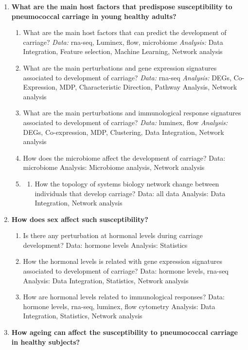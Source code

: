\documentclass[
]{book}
\providecommand{\tightlist}{%
  \setlength{\itemsep}{0pt}\setlength{\parskip}{0pt}}
\begin{document}
\begin{enumerate}
\def\labelenumi{\arabic{enumi}.}
\item
  \textbf{What are the main host factors that predispose susceptibility to pneumococcal carriage in young healthy adults?}

  \begin{enumerate}
  \def\labelenumii{\arabic{enumii}.}
  \item
    What are the main host factors that can predict the development of carriage? \emph{Data:} rna-seq, Luminex, flow, microbiome \emph{Analysis:} Data Integration, Feature selection, Machine Learning, Network analysis
  \item
    What are the main perturbations and gene expression signatures associated to development of carriage? \emph{Data:} rna-seq \emph{Analysis:} DEGs, Co-Expression, MDP, Characteristic Direction, Pathway Analysis, Network analysis
  \item
    What are the main perturbations and immunological response signatures associated to development of carriage? \emph{Data:} luminex, flow \emph{Analysis:} DEGs, Co-expression, MDP, Clustering, Data Integration, Network analysis
  \item
    How does the microbiome affect the development of carriage? Data: microbiome Analysis: Microbiome analysis, Network analysis
  \item
    \begin{enumerate}
    \def\labelenumiii{\arabic{enumiii}.}
    \tightlist
    \item
      How the topology of systems biology network change between individuals that develop carriage? Data: all data Analysis: Data Integration, Network analysis
    \end{enumerate}
  \end{enumerate}
\item
  \textbf{How does sex affect such susceptibility?}

  \begin{enumerate}
  \def\labelenumii{\arabic{enumii}.}
  \item
    Is there any perturbation at hormonal levels during carriage development? Data: hormone levels Analysis: Statistics
  \item
    How the hormonal levels is related with gene expression signatures associated to development of carriage? Data: hormone levels, rna-seq Analysis: Data Integration, Statistics, Network analysis
  \item
    How are hormonal levels related to immunological responses? Data: hormone levels, rna-seq, luminex, flow cytometry Analysis: Data Integration, Statistics, Network analysis
  \end{enumerate}
\item
  \textbf{How ageing can affect the susceptibility to pneumococcal carriage in healthy subjects?}


\end{enumerate}
\end{document}
